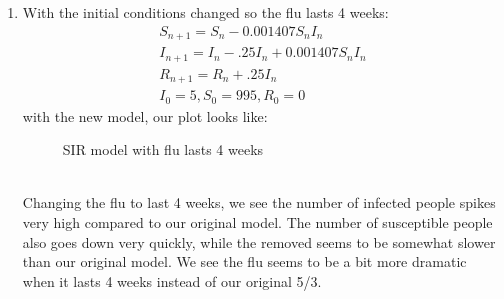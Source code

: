 \documentclass[12pt,letterpaper]{article}
\begin{document}
\begin{enumerate}
\begin{enumerate}
  \item With the initial conditions changed so the flu lasts 4 weeks: 
  \begin{eqnarray*}
    S_{n+1} = S_{n} - 0.001407S_{n}I_{n}\\
    I_{n+1} = I_{n} - .25I_{n} + 0.001407S_{n}I_{n}\\
    R_{n+1} = R_{n} + .25I_{n} \\
    I_{0} = 5, S_{0} = 995, R_{0} = 0
  \end{eqnarray*}
  with the new model, our plot looks like: 
  \begin{figure}[!htb]
    \caption{\label{fig:12} SIR model with flu lasts 4 weeks}
  \end{figure}\\
\pagebreak
  Changing the flu to last 4 weeks, we see the number of infected people spikes very high
  compared to our original model. The number of susceptible people also goes down very quickly, 
  while the removed seems to be somewhat slower than our original model. We see the flu seems to 
  be a bit more dramatic when it lasts 4 weeks instead of our original 5/3. 


\end{enumerate}
\end{enumerate}
\end{document}
